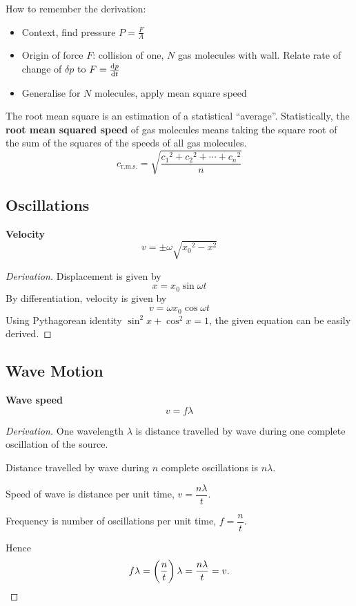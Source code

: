 \begin{remark}
How to remember the derivation:
\begin{itemize}
\item Context, find pressure $P=\frac{F}{A}$
\item Origin of force $F$: collision of one, $N$ gas molecules with wall. Relate rate of change of $\delta p$ to $F=\dv{p}{t}$
\item Generalise for $N$ molecules, apply mean square speed
\end{itemize}
\end{remark}
\begin{remark}
The root mean square is an estimation of a statistical ``average''. Statistically, the \textbf{root mean squared speed} of gas molecules means taking the square root of the sum of the squares of the speeds of all gas molecules.
\[ c_{\text{r.m.s.}} = \sqrt{\frac{{c_1}^2+{c_2}^2+\cdots+{c_n}^2}{n}} \]
\end{remark}
\pagebreak

\subsection{Oscillations}
\textbf{Velocity}
\[ v=\pm\omega\sqrt{{x_0}^2-x^2} \]
\begin{proof}[Derivation]
Displacement is given by
\[ x=x_0\sin\omega t \]
By differentiation, velocity is given by
\[ v=\omega x_0\cos\omega t \]
Using Pythagorean identity $\sin^2 x+\cos^2 x=1$, the given equation can be easily derived.
\end{proof}
\pagebreak

\subsection{Wave Motion}
\textbf{Wave speed}
\[ v=f\lambda \]
\begin{proof}[Derivation]
One wavelength $\lambda$ is distance travelled by wave during one complete oscillation of the source.

Distance travelled by wave during $n$ complete oscillations is $n\lambda$.

Speed of wave is distance per unit time, $v=\dfrac{n\lambda}{t}$.

Frequency is number of oscillations per unit time, $f=\dfrac{n}{t}$.

Hence
\[ f\lambda=\left(\frac{n}{t}\right)\lambda=\frac{n\lambda}{t}=v. \]
\end{proof}
\pagebreak

